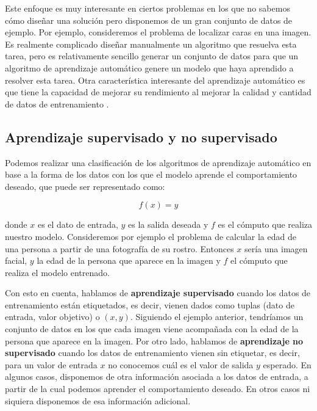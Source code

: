 Este enfoque es muy interesante en ciertos problemas en los que no sabemos cómo diseñar una solución pero disponemos de un gran conjunto de datos de ejemplo. Por ejemplo, consideremos el problema de localizar caras en una imagen. Es realmente complicado diseñar manualmente un algoritmo que resuelva esta tarea, pero es relativamente sencillo generar un conjunto de datos para que un algoritmo de aprendizaje automático genere un modelo que haya aprendido a resolver esta tarea. Otra característica interesante del aprendizaje automático es que tiene la capacidad de mejorar su rendimiento al mejorar la calidad y cantidad de datos de entrenamiento \cite{informatica:paper_que_es_ml}.

\subsection{Aprendizaje supervisado y no supervisado}

Podemos realizar una clasificación de los algoritmos de aprendizaje automático en base a la forma de los datos con los que el modelo aprende el comportamiento deseado, que puede ser representado como:

\begin{equation}
	f(x) = y
\end{equation}

donde $x$ es el dato de entrada, $y$ es la salida deseada y $f$ es el cómputo que realiza nuestro modelo. Consideremos por ejemplo el problema de calcular la edad de una persona a partir de una fotografía de su rostro. Entonces $x$ sería una imagen facial, $y$ la edad de la persona que aparece en la imagen y $f$ el cómputo que realiza el modelo entrenado.

Con esto en cuenta, hablamos de \textbf{aprendizaje supervisado} cuando los datos de entrenamiento están etiquetados, es decir, vienen dados como tuplas (dato de entrada, valor objetivo) o $(x, y)$. Siguiendo el ejemplo anterior, tendríamos un conjunto de datos en los que cada imagen viene acompañada con la edad de la persona que aparece en la imagen. Por otro lado, hablamos de \textbf{aprendizaje no supervisado} cuando los datos de entrenamiento vienen sin etiquetar, es decir, para un valor de entrada $x$ no conocemos cuál es el valor de salida $y$ esperado. En algunos casos, disponemos de otra información asociada a los datos de entrada, a partir de la cual podemos aprender el comportamiento deseado. En otros casos ni siquiera disponemos de esa información adicional.

